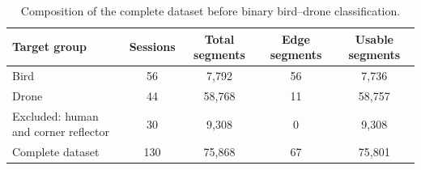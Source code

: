 \begin{table}[htbp]
\centering
\small
\begin{tabular}{lcccc}
\toprule
Target group & Sessions & Total segments & Edge segments & Usable segments \\
\midrule
Bird & 56 & 7,792 & 56 & 7,736 \\
Drone & 44 & 58,768 & 11 & 58,757 \\
Excluded: human and corner reflector & 30 & 9,308 & 0 & 9,308 \\
Complete dataset & 130 & 75,868 & 67 & 75,801 \\
\bottomrule
\end{tabular}
\caption{Composition of the complete dataset before binary bird--drone classification.}
\label{tab:dataset-composition}
\end{table}
